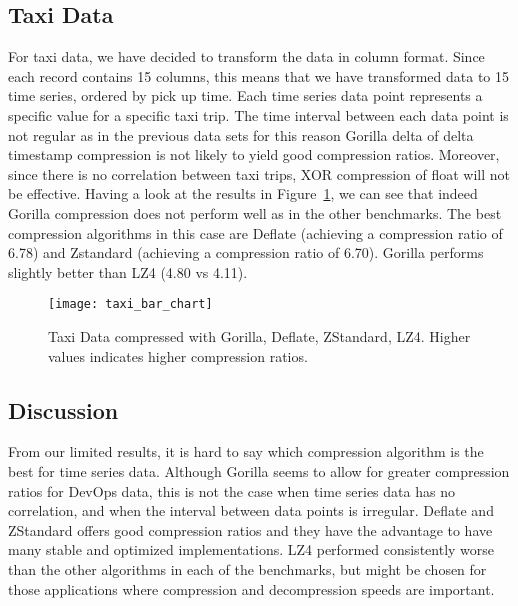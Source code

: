 \subsection{Taxi Data}
For taxi data, we have decided to transform the data in column format.
Since each record contains 15 columns, this means that we have transformed data to 15 time series,
ordered by pick up time.
Each time series data point represents a specific value for a specific taxi trip.
The time interval between each data point is not regular as in the previous data sets for this
reason Gorilla delta of delta timestamp compression is not likely to yield good compression
ratios. Moreover, since there is no correlation between taxi trips, XOR compression of float will
not be effective.
Having a look at the results in Figure~\ref{taxi_bar_chart}, we can see that indeed Gorilla compression does not perform well as
in the other benchmarks. The best compression algorithms in this case are Deflate (achieving a compression
ratio of 6.78) and Zstandard (achieving a compression ratio of 6.70). Gorilla performs slightly
better than LZ4 (4.80 vs 4.11).

\begin{figure}[!htbp]
\begin{center}
\texttt{[image: taxi\_bar\_chart]}
\caption[compression]{Taxi Data compressed with Gorilla, Deflate, ZStandard, LZ4.
Higher values indicates higher compression ratios.}
\label{taxi_bar_chart}
\end{center}
\end{figure}

\subsection{Discussion}
From our limited results, it is hard to say which compression algorithm is the best for time series data.
Although Gorilla seems to allow for greater compression ratios for DevOps data, this is not the case when
time series data has no correlation, and when the interval between data points is irregular.
Deflate and ZStandard offers good compression ratios and they have the advantage to have many stable and
optimized implementations.
LZ4 performed consistently worse than the other algorithms in each of the benchmarks, but might be chosen
for those applications where compression and decompression speeds are important.

